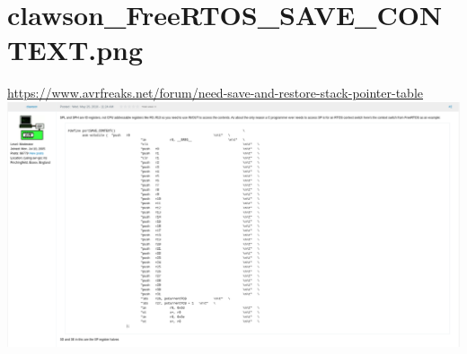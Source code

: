 \documentclass{article}
\begin{document}
\tableofcontents
\newpage
\section{clawson\_FreeRTOS\_SAVE\_CONTEXT.png}
\url{https://www.avrfreaks.net/forum/need-save-and-restore-stack-pointer-table}\\
\includegraphics[width=\textwidth]{clawson_FreeRTOS_SAVE_CONTEXT.png}
\end{document}
